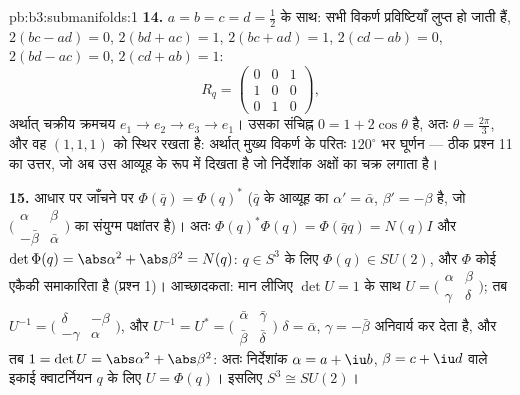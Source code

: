 \begin{solution}{pb:b3:submanifolds:1}
\textbf{14.} $a = b = c = d = \frac12$ के साथ: सभी विकर्ण प्रविष्टियाँ लुप्त हो जाती
हैं, $2(bc - ad) = 0$, $2(bd + ac) = 1$, $2(bc +
ad) = 1$, $2(cd - ab) = 0$, $2(bd - ac) = 0$, $2(cd + ab) =
1$:
\[
R_q = \begin{pmatrix} 0 & 0 & 1\\ 1 & 0 & 0\\ 0 & 1 & 0
\end{pmatrix},
\]
अर्थात् चक्रीय क्रमचय $e_1 \to e_2 \to e_3 \to e_1$। उसका संचिह्न $0 = 1 + 2\cos\theta$ है, अतः $\theta = \frac{2\pi}3$, और वह
$(1,1,1)$ को स्थिर रखता है: अर्थात् मुख्य विकर्ण के परितः $120^\circ$ भर घूर्णन
--- ठीक प्रश्न 11 का उत्तर, जो अब उस आव्यूह के रूप में दिखता है जो
निर्देशांक अक्षों का चक्र लगाता है।

\textbf{15.} आधार पर जाँचने पर $\Phi(\bar q) =
\Phi(q)^*$ ($\bar q$ के आव्यूह का $\alpha' =
\bar\alpha$, $\beta' = -\beta$
है, जो $\bigl(\begin{smallmatrix}\alpha & \beta\\
-\bar\beta & \bar\alpha\end{smallmatrix}\bigr)$ का संयुग्म पक्षांतर है)। अतः $\Phi(q)^*\Phi(q) = \Phi(\bar qq) = N(q)I$ और $\det\Phi(q)
= \abs\alpha^2 + \abs\beta^2 = N(q)$: $q \in S^3$ के
लिए $\Phi(q) \in SU(2)$, और $\Phi$ कोई एकैकी समाकारिता है (प्रश्न 1)। आच्छादकता:
मान लीजिए $\det U = 1$ के साथ $U =
\bigl(\begin{smallmatrix}\alpha & \beta\\ \gamma &
\delta\end{smallmatrix}\bigr)$; तब $U^{-1} = \bigl(\begin{smallmatrix}\delta & -\beta\\
-\gamma & \alpha\end{smallmatrix}\bigr)$, और $U^{-1} = U^*
= \bigl(\begin{smallmatrix}\bar\alpha & \bar\gamma\\
\bar\beta & \bar\delta\end{smallmatrix}\bigr)$ $\delta = \bar\alpha$, $\gamma = -\bar\beta$ अनिवार्य
कर देता है, और तब $1 =
\det U = \abs\alpha^2 + \abs\beta^2$: अतः निर्देशांक $\alpha = a + \iu b$, $\beta = c + \iu d$ वाले इकाई
क्वाटर्नियन $q$ के लिए $U = \Phi(q)$। इसलिए $S^3 \cong SU(2)$।


\end{solution}
